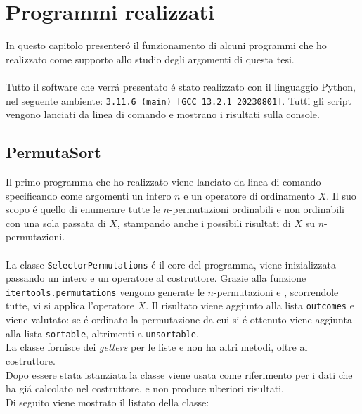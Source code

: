 \chapter{Programmi realizzati}
In questo capitolo presenter\'o il funzionamento di alcuni programmi che ho realizzato come supporto allo studio degli argomenti di questa tesi.\\\\
Tutto il software che verr\'a presentato \'e stato realizzato con il linguaggio Python, nel seguente ambiente: \texttt{3.11.6 (main) [GCC 13.2.1 20230801]}. Tutti gli script vengono lanciati da linea di comando e mostrano i risultati sulla console.
\section*{PermutaSort}
Il primo programma che ho realizzato viene lanciato da linea di comando specificando come argomenti un intero $n$ e un operatore di ordinamento $X$. Il suo scopo \'e quello di enumerare tutte le $n$-permutazioni ordinabili e non ordinabili con una sola passata di $X$, stampando anche i possibili risultati di $X$ su $n$-permutazioni.\\\\
La classe \texttt{SelectorPermutations} \'e il core del programma, viene inizializzata passando un intero e un operatore al costruttore. Grazie alla funzione \texttt{itertools.permutations} vengono generate le $n$-permutazioni e , scorrendole tutte, vi si applica l'operatore $X$. Il risultato viene aggiunto alla lista \texttt{outcomes} e viene valutato: se \'e ordinato la permutazione da cui si \'e ottenuto viene aggiunta alla lista \texttt{sortable}, altrimenti a \texttt{unsortable}.\\La classe fornisce dei \textit{getters} per le liste e non ha altri metodi, oltre al costruttore.\\
Dopo essere stata istanziata la classe viene usata come riferimento per i dati che ha gi\'a calcolato nel costruttore, e non produce ulteriori risultati.\\Di seguito viene mostrato il listato della classe:
\\
